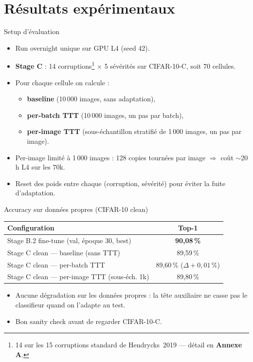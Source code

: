 \documentclass[10pt,aspectratio=169]{beamer}
\begin{document}
\section{Résultats expérimentaux}

\begin{frame}{Setup d'évaluation}
  \begin{itemize}
    \item Run overnight unique sur GPU L4 (seed 42).
    \item \textbf{Stage C} : 14 corruptions\footnote{14 sur les 15 corruptions standard de Hendrycks~2019 --- détail en \textbf{Annexe A}.} $\times$ 5 sévérités sur CIFAR-10-C, soit 70 cellules.
    \item Pour chaque cellule on calcule :
    \begin{itemize}
      \item \textbf{baseline} (10\,000 images, sans adaptation),
      \item \textbf{per-batch TTT} (10\,000 images, un pas par batch),
      \item \textbf{per-image TTT} (sous-échantillon stratifié de 1\,000 images, un pas par image).
    \end{itemize}
    \item Per-image limité à 1\,000 images : 128 copies tournées par image $\Rightarrow$ coût $\sim$20\,h L4 sur les 70k.
    \item Reset des poids entre chaque (corruption, sévérité) pour éviter la fuite d'adaptation.
  \end{itemize}
\end{frame}

\begin{frame}{Accuracy sur données propres (CIFAR-10 clean)}
  \centering
  \begin{tabular}{lc}
    \toprule
    \textbf{Configuration} & \textbf{Top-1} \\
    \midrule
    Stage B.2 fine-tune (val, époque 30, best) & \textbf{90,08\,\%} \\
    Stage C clean --- baseline (sans TTT)      & 89,59\,\% \\
    Stage C clean --- per-batch TTT            & 89,60\,\% \;($\Delta\!+\!0{,}01\,\%$) \\
    Stage C clean --- per-image TTT (sous-éch. 1k) & 89,80\,\% \\
    \bottomrule
  \end{tabular}

  \vspace{1em}
  \begin{itemize}
    \item Aucune dégradation sur les données propres : la tête auxiliaire ne casse pas le classifieur quand on l'adapte au test.
    \item Bon sanity check avant de regarder CIFAR-10-C.
  \end{itemize}
\end{frame}
\end{document}
